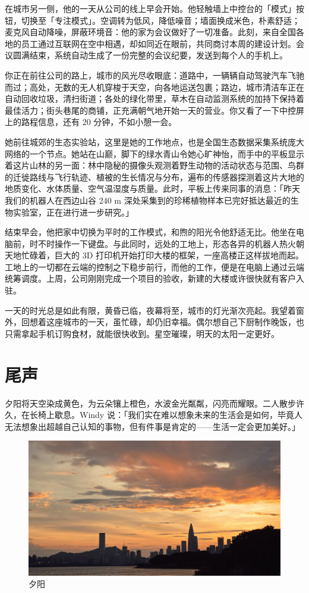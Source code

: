 在城市另一侧，他的一天从公司的线上早会开始。他轻触墙上中控台的「模式」按钮，切换至「专注模式」。空调转为低风，降低噪音；墙面换成米色，朴素舒适；麦克风自动降噪，屏蔽环境音：他的家为会议做好了一切准备。此刻，来自全国各地的员工通过互联网在空中相遇，却如同近在眼前，共同商讨本周的建设计划。会议圆满结束，系统自动生成了一份完整的会议纪要，发送到每个人的手机上。

你正在前往公司的路上，城市的风光尽收眼底：道路中，一辆辆自动驾驶汽车飞驰而过；高处，无数的无人机穿梭于天空，向各地运送包裹；路边，城市清洁车正在自动回收垃圾，清扫街道；各处的绿化带里，草木在自动监测系统的加持下保持着最佳活力；街头巷尾的商铺，正充满朝气地开始一天的营业。你又看了一下中控屏上的路程信息，还有 20 分钟，不如小憩一会。

她前往城郊的生态实验站，这里是她的工作地点，也是全国生态数据采集系统庞大网络的一个节点。她站在山巅，脚下的绿水青山令她心旷神怡，而手中的平板显示着这片山林的另一面：林中隐秘的摄像头观测着野生动物的活动状态与范围、鸟群的迁徙路线与飞行轨迹、植被的生长情况与分布，遍布的传感器探测着这片大地的地质变化、水体质量、空气温湿度与质量。此时，平板上传来同事的消息：「昨天我们的机器人在西边山谷 240 m 深处采集到的珍稀植物样本已完好抵达最近的生物实验室，正在进行进一步研究。」

结束早会，他把家中切换为平时的工作模式，和煦的阳光令他舒适无比。他坐在电脑前，时不时操作一下键盘。与此同时，远处的工地上，形态各异的机器人热火朝天地忙碌着，巨大的 3D 打印机开始打印大楼的框架，一座高楼正这样拔地而起。工地上的一切都在云端的控制之下稳步前行，而他的工作，便是在电脑上通过云端统筹调度。上周，公司刚刚完成一个项目的验收，新建的大楼或许很快就有客户入驻。

一天的时光总是如此有限，黄昏已临，夜幕将至，城市的灯光渐次亮起。我望着窗外，回想着这座城市的一天，虽忙碌，却仍旧幸福。偶尔想自己下厨制作晚饭，也只需拿起手机订购食材，就能很快收到。星空璀璨，明天的太阳一定更好。

\section{尾声}

夕阳将天空染成黄色，为云朵镶上橙色，水波金光粼粼，闪亮而耀眼。二人散步许久，在长椅上歇息。Windy 说：「我们实在难以想象未来的生活会是如何，毕竟人无法想象出超越自己认知的事物，但有件事是肯定的——生活一定会更加美好。」

\begin{figure}[htb!]
  \centering
  \includegraphics[width=.7\textwidth]{assets/surpass/The_dusk.jpg}
  \caption{夕阳}
  \label{fig:The_dusk}
\end{figure}


